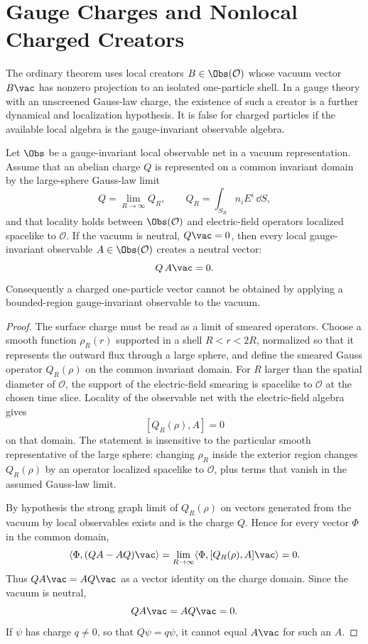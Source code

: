 \section{Gauge Charges and Nonlocal Charged Creators}

The ordinary theorem uses local creators \(B\in\Obs(\mathcal O)\) whose
vacuum vector \(B\vac\) has nonzero projection to an isolated one-particle
shell.  In a gauge theory with an unscreened Gauss-law charge, the existence
of such a creator is a further dynamical and localization hypothesis.  It is
false for charged particles if the available local algebra is the
gauge-invariant observable algebra.

\begin{theorem}
\label{thm:gauss-law-obstruction-local-charged-creators}
Let \(\Obs\) be a gauge-invariant local observable net in a vacuum
representation.  Assume that an abelian charge \(Q\) is represented on a
common invariant domain by the large-sphere Gauss-law limit
\[
  Q=\lim_{R\to\infty}Q_R,\qquad
  Q_R=\int_{S_R} n_i E^i\,\dd S ,
\]
and that locality holds between \(\Obs(\mathcal O)\) and electric-field
operators localized spacelike to \(\mathcal O\).  If the vacuum is neutral,
\(Q\vac=0\), then every local gauge-invariant observable \(A\in\Obs(\mathcal O)\)
creates a neutral vector:
\[
  Q\,A\vac=0 .
\]
Consequently a charged one-particle vector cannot be obtained by applying a
bounded-region gauge-invariant observable to the vacuum.
\end{theorem}

\begin{proof}
The surface charge must be read as a limit of smeared operators.  Choose a
smooth function \(\rho_R(r)\) supported in a shell \(R<r<2R\), normalized so
that it represents the outward flux through a large sphere, and define the
smeared Gauss operator \(Q_R(\rho)\) on the common invariant domain.  For
\(R\) larger than the spatial diameter of \(\mathcal O\), the support of the
electric-field smearing is spacelike to \(\mathcal O\) at the chosen time
slice.  Locality of the observable net with the electric-field algebra gives
\[
  [Q_R(\rho),A]=0
\]
on that domain.  The statement is insensitive to the particular smooth
representative of the large sphere: changing \(\rho_R\) inside the exterior
region changes \(Q_R(\rho)\) by an operator localized spacelike to
\(\mathcal O\), plus terms that vanish in the assumed Gauss-law limit.

By hypothesis the strong graph limit of \(Q_R(\rho)\) on vectors generated
from the vacuum by local observables exists and is the charge \(Q\).  Hence
for every vector \(\Phi\) in the common domain,
\[
  \langle \Phi,(QA-AQ)\vac\rangle
  =
  \lim_{R\to\infty}\langle \Phi,[Q_R(\rho),A]\vac\rangle
  =
  0 .
\]
Thus \(QA\vac=AQ\vac\) as a vector identity on the charge domain.  Since the
vacuum is neutral,
\[
  Q A\vac=AQ\vac=0 .
\]
If \(\psi\) has charge \(q\ne0\), so that \(Q\psi=q\psi\), it cannot equal
\(A\vac\) for such an \(A\).
\end{proof}

